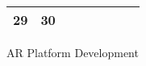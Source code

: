 {\begin{tabularx}{\linewidth}{|l!{\vrule width \myLenLineThicknessThick}*{7}{@{}X@{}|}}
      
      
        \begin{minipage}[t]{6mm}\centering{}29\end{minipage}
      
       & 
    
      
      
        \begin{minipage}[t]{6mm}\centering{}30\end{minipage}
      
       & 
    
      
      
       & 
    
      
      
       & 
    
      
      
       & 
    
      
      
       & 
    
      
      
      
        \\  \hline 
      
    
  
  
  \end{tabularx}
}
\vfill{\centering{} \small{AR Platform Development}\hspace{ 1.5em }\par}

